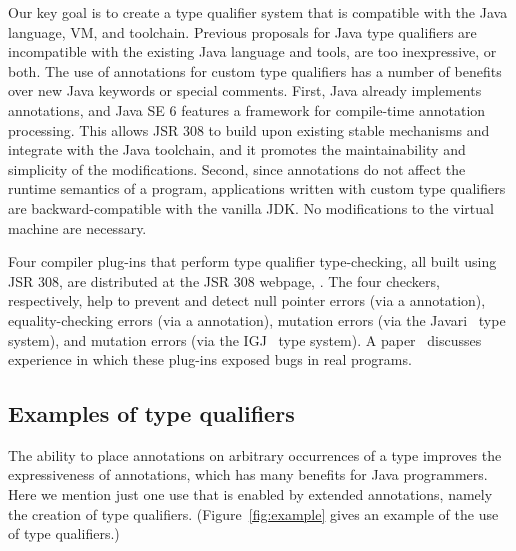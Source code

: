 \documentclass[10pt]{article}
\begin{document}
Our key goal is to create a type qualifier system that is compatible with
the Java language, VM, and toolchain.
Previous proposals
for Java type qualifiers are incompatible with the existing Java language
and tools, are too inexpressive, or both.
The use of annotations for custom type qualifiers has a number of
benefits over new Java keywords or special comments. First, Java
already implements annotations, and Java SE 6 features a framework
for compile-time annotation processing. This allows JSR 308 to
build upon existing stable mechanisms and integrate with the Java
toolchain, and it promotes the maintainability and simplicity of the
modifications. Second, since annotations do not affect the runtime
semantics of a program, applications written with custom type
qualifiers are backward-compatible with the vanilla JDK\@.
No modifications to the virtual machine are necessary.

Four compiler plug-ins that perform type qualifier type-checking, all built
using JSR 308, are distributed at the JSR 308 webpage,
.  The four checkers, respectively,
help to prevent and detect null pointer errors (via a 
annotation), equality-checking errors (via a  annotation),
mutation errors (via the Javari~\cite{BirkaE2004,TschantzE2005} type
system), and mutation errors (via the IGJ~\cite{ZibinPAAKE2007} type
system).  A paper~\cite{PapiACPE2008} discusses experience
in which these plug-ins exposed bugs in real programs.


\subsection{Examples of type qualifiers\label{type-qualifier-examples}}

The ability to place annotations on arbitrary occurrences of a type
improves the expressiveness of annotations, which has many benefits for
Java programmers.  Here we mention just one use that is enabled by extended
annotations, namely the creation of type qualifiers.
(Figure~\ref{fig:example} gives an example of the use of type qualifiers.)
\end{document}
